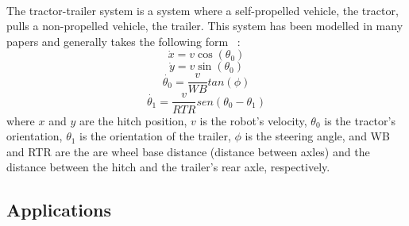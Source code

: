 \paragraph{}The tractor-trailer system is a system where a self-propelled vehicle, the tractor, pulls a 
non-propelled vehicle, the trailer. This system has been modelled in many papers and generally takes the 
following form ~\cite{theman, ttdynamics2}:
\begin{equation}
    \dot{x} = v \cos(\theta_0)
\end{equation}
\begin{equation}
    \dot{y} = v \sin(\theta_0)
\end{equation}
\begin{equation}
    \dot{\theta_0} = \frac{v}{WB}tan(\phi)
\end{equation}
\begin{equation}
    \dot{\theta_1} = \frac{v}{RTR}sen(\theta_0-\theta_1)
\end{equation}
where $x$ and $y$ are the hitch position, $v$ is the robot's velocity, 
$\theta_0$ is the tractor's orientation, $\theta_1$ is the orientation of the trailer, $\phi$ is the 
steering angle, and WB and RTR are the are wheel base distance (distance between axles) 
and the distance between the hitch and the trailer's rear axle, respectively.

\subsection{Applications}
\label{subsec:APP}
